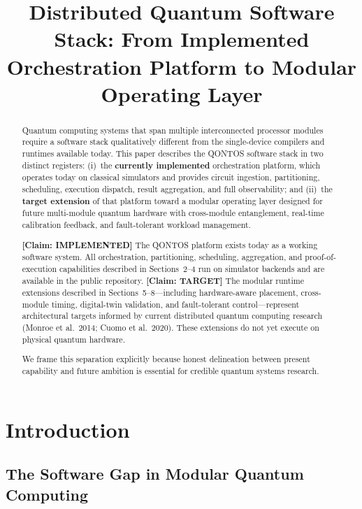 \documentclass[conference]{IEEEtran}
\begin{document}
\title{Distributed Quantum Software Stack: From Implemented Orchestration Platform to Modular Operating Layer}

\author{\qontosauthor}

\maketitle

\begin{abstract}
Quantum computing systems that span multiple interconnected processor modules require a software stack qualitatively different from the single-device compilers and runtimes available today. This paper describes the QONTOS software stack in two distinct registers: (i)~the \textbf{currently implemented} orchestration platform, which operates today on classical simulators and provides circuit ingestion, partitioning, scheduling, execution dispatch, result aggregation, and full observability; and (ii)~the \textbf{target extension} of that platform toward a modular operating layer designed for future multi-module quantum hardware with cross-module entanglement, real-time calibration feedback, and fault-tolerant workload management.

\textbf{[Claim: IMPLEMENTED]} The QONTOS platform exists today as a working software system. All orchestration, partitioning, scheduling, aggregation, and proof-of-execution capabilities described in Sections~2--4 run on simulator backends and are available in the public repository. \textbf{[Claim: TARGET]} The modular runtime extensions described in Sections~5--8---including hardware-aware placement, cross-module timing, digital-twin validation, and fault-tolerant control---represent architectural targets informed by current distributed quantum computing research (Monroe et al.\ 2014; Cuomo et al.\ 2020). These extensions do not yet execute on physical quantum hardware.

We frame this separation explicitly because honest delineation between present capability and future ambition is essential for credible quantum systems research.
\end{abstract}

\section{Introduction}

\subsection{The Software Gap in Modular Quantum Computing}
\end{document}
